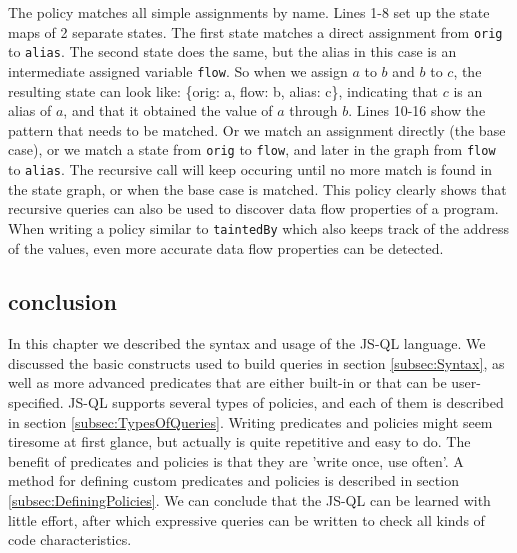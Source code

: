 The policy matches all simple assignments by name. Lines 1-8 set up the state maps of 2 separate states. The first state matches a direct assignment from \texttt{orig} to \texttt{alias}. The second state does the same, but the alias in this case is an intermediate assigned variable \texttt{flow}. So when we assign $a$ to $b$ and $b$ to $c$, the resulting state can look like: \{orig: a, flow: b, alias: c\}, indicating that $c$ is an alias of $a$, and that it obtained the value of $a$ through $b$. Lines 10-16 show the pattern that needs to be matched. Or we match an assignment directly (the base case), or we match a state from \texttt{orig} to \texttt{flow}, and later in the graph from \texttt{flow} to \texttt{alias}. The recursive call will keep occuring until no more match is found in the state graph, or when the base case is matched. This policy clearly shows that recursive queries can also be used to discover data flow properties of a program. When writing a policy similar to \texttt{taintedBy} which also keeps track of the address of the values, even more accurate data flow properties can be detected.

\subsection{conclusion}
In this chapter we described the syntax and usage of the JS-QL language. We discussed the basic constructs used to build queries in section \ref{subsec:Syntax}, as well as more advanced predicates that are either built-in or that can be user-specified. JS-QL supports several types of policies, and each of them is described in section \ref{subsec:TypesOfQueries}.
Writing predicates and policies might seem tiresome at first glance, but actually is quite repetitive and easy to do. The benefit of predicates and policies is that they are 'write once, use often'. A method for defining custom predicates and policies is described in section \ref{subsec:DefiningPolicies}. We can conclude that the JS-QL can be learned with little effort, after which expressive queries can be written to check all kinds of code characteristics. 